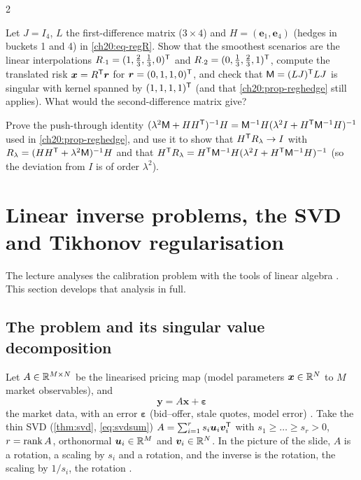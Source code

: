 \begin{paracol}{2}
\begin{exercise}
Let $J=I_4$, $L$ the first-difference matrix ($3\times4$) and $H=(\bm e_1,\bm e_4)$ (hedges in buckets 1 and 4) in \eqref{ch20:eq-regR}. Show that the smoothest scenarios are the linear interpolations $R_{\cdot1}=(1,\tfrac23,\tfrac13,0)^{\mathsf T}$ and $R_{\cdot2}=(0,\tfrac13,\tfrac23,1)^{\mathsf T}$, compute the translated risk $\bm x=R^{\mathsf T}\bm r$ for $\bm r=(0,1,1,0)^{\mathsf T}$, and check that $\mathsf M=(LJ)^{\mathsf T} LJ$ is singular with kernel spanned by $(1,1,1,1)^{\mathsf T}$ (and that \cref{ch20:prop-reghedge} still applies). What would the second-difference matrix give?
\end{exercise}

\begin{exercise}
Prove the push-through identity $(\lambda^2\mathsf M+HH^{\mathsf T})^{-1}H=\mathsf M^{-1}H(\lambda^2I+H^{\mathsf T}\mathsf M^{-1}H)^{-1}$ used in \cref{ch20:prop-reghedge}, and use it to show that $H^{\mathsf T} R_\lambda\to I$ with $R_\lambda=(HH^{\mathsf T}+\lambda^2\mathsf M)^{-1}H$ and that $H^{\mathsf T} R_\lambda=H^{\mathsf T}\mathsf M^{-1}H(\lambda^2I+H^{\mathsf T}\mathsf M^{-1}H)^{-1}$ (so the deviation from $I$ is of order $\lambda^2$).
\end{exercise}

\section{Linear inverse problems, the SVD and Tikhonov regularisation}\label{ch20:sec-inverse}

The lecture analyses the calibration problem with the tools of linear algebra . This section develops that analysis in full.

\subsection{The problem and its singular value decomposition}\label{ch20:sec-svdprob}
Let $A\in\mathbb{R}^{M\times N}$ be the linearised pricing map (model parameters $\bm x\in\mathbb{R}^N$ to $M$ market observables), and
\begin{equation}\label{ch20:eq-inv}
  \bm y=A\bm x+\bm\varepsilon
\end{equation}
the market data, with an error $\bm\varepsilon$ (bid--offer, stale quotes, model error) . Take the thin SVD (\cref{thm:svd}, \cref{eq:svdsum})
$A=\sum_{i=1}^rs_i\bm u_i\bm v_i^{\mathsf T}$ with $s_1\ge\dots\ge s_r>0$, $r=\operatorname{rank} A$, orthonormal $\bm u_i\in\mathbb{R}^M$ and $\bm v_i\in\mathbb{R}^N$. In the picture of the slide, $A$ is a rotation, a scaling by $s_i$ and a rotation, and the
inverse is the rotation, the scaling by $1/s_i$, the rotation .


\end{paracol}
